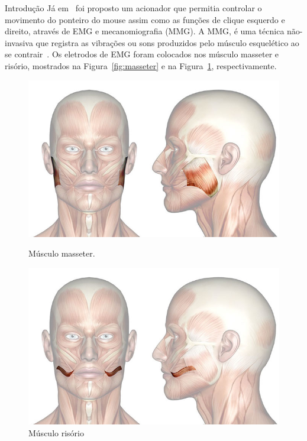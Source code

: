 \begin{chapter}{Introdução}
Já em~\cite{Kaushik12} foi proposto um acionador que permitia controlar o
movimento do ponteiro do mouse assim como as funções de clique esquerdo e
direito, através de EMG e mecanomiografia (MMG). A MMG, é uma técnica
não-invasiva que registra as vibrações ou sons produzidos pelo músculo
esquelético ao se contrair~\cite{Vaz99}. Os eletrodos de EMG foram colocados nos
músculo masseter e risório, mostrados na Figura~\ref{fig:masseter} e na
Figura~\ref{fig:risorio}, respectivamente. %
\begin{figure}[h!]
    \centering
    \begin{minipage}{.5\textwidth}
        \centering
        \includegraphics[width=0.9\linewidth, height=0.2\textheight]{fig/masseter}
        \caption{Músculo masseter.}
        \label{fig:masseter}
    \end{minipage}%
    \begin{minipage}{0.5\textwidth}
        \centering
        \includegraphics[width=0.91\linewidth, height=0.2\textheight]{fig/risorio}
        \caption{Músculo risório}
        \label{fig:risorio}
    \end{minipage}

\end{figure}
\end{chapter}
